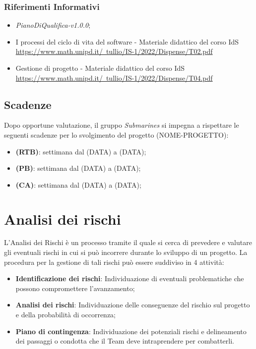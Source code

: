 \subsubsection{Riferimenti Informativi} %
\begin{itemize}
    \item \emph{PianoDiQualifica-v1.0.0};
    \item I processi del ciclo di vita del software - Materiale didattico del corso IdS \\ \href{https://www.math.unipd.it/~tullio/IS-1/2022/Dispense/T02.pdf}{\color{blue}https://www.math.unipd.it/~tullio/IS-1/2022/Dispense/T02.pdf}
    \item Gestione di progetto - Materiale didattico del corso IdS \\ \href{https://www.math.unipd.it/~tullio/IS-1/2022/Dispense/T04.pdf}{\color{blue}https://www.math.unipd.it/~tullio/IS-1/2022/Dispense/T04.pdf}
\end{itemize}

\subsection{Scadenze}
Dopo opportune valutazione, il gruppo \emph{Submarines} si impegna a rispettare le seguenti scadenze per lo svolgimento del progetto (NOME-PROGETTO):
\begin{itemize}
    \item \textbf{\RTB{} (RTB)}: settimana dal (DATA) a (DATA);
    \item \textbf{\PB{} (PB)}: settimana dal (DATA) a (DATA);
    \item \textbf{\CA{} (CA)}: settimana dal (DATA) a (DATA);
\end{itemize}

\section{Analisi dei rischi}
L'Analisi dei Rischi è un processo tramite il quale si cerca di prevedere e valutare gli eventuali rischi in cui si può
incorrere durante lo sviluppo di un progetto. La procedura per la gestione di tali rischi può essere suddiviso in 4 attività:
\begin{itemize}
    \item \textbf{Identificazione dei rischi}: Individuazione di eventuali problematiche che possono compromettere l'avanzamento;
    \item \textbf{Analisi dei rischi}: Individuazione delle conseguenze del rischio sul progetto e della probabilità di occorrenza;
    \item \textbf{Piano di contingenza}: Individuazione dei potenziali rischi e delineamento dei passaggi o condotta che il Team deve intraprendere per combatterli.
\end{itemize}



